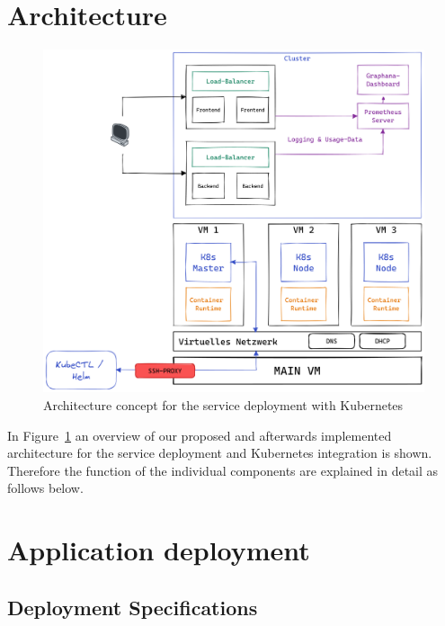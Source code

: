 \section{Architecture}
    
    \begin{figure}[htbp]
        \includegraphics[width=15cm]{docs/assets/architecture-overview.png}
        \centering
        \captionsetup{justification=centering, margin=1cm}
        \caption{Architecture concept for the service deployment with Kubernetes}
        \label{fig:Architecture}
    \end{figure}

    In Figure~\ref{fig:Architecture} an overview of our proposed and afterwards implemented architecture for the service deployment and Kubernetes integration is shown. Therefore the function of the individual components are explained in detail as follows below.

\section{Application deployment}
    \subsection{Deployment Specifications}
